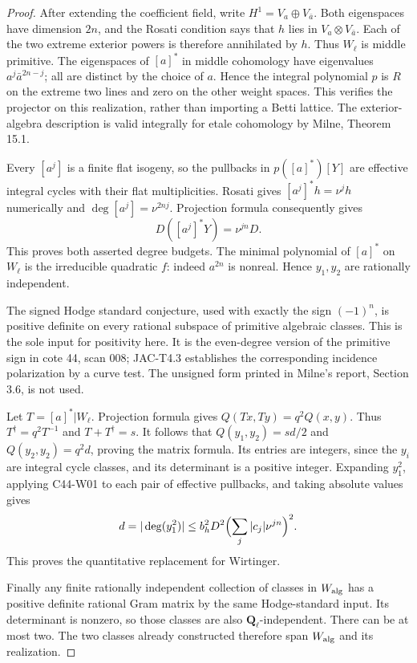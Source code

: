 \documentclass[11pt]{article}
\theoremstyle{remark}\newtheorem{remark}[theorem]{Remark}
\begin{document}
\begin{proof}
After extending the coefficient field, write $H^1=V_a\oplus V_{\bar a}$.
Both eigenspaces have dimension $2n$, and the Rosati condition says
that $h$ lies in $V_a\otimes V_{\bar a}$.  Each of the two extreme
exterior powers is therefore annihilated by $h$.  Thus $W_\ell$ is
middle primitive.  The eigenspaces of $[a]^*$ in middle cohomology
have eigenvalues $a^j\bar a^{2n-j}$; all are distinct by the choice
of $a$.  Hence the integral polynomial $p$ is $R$ on the extreme
two lines and zero on the other weight spaces.  This verifies the
projector on this realization, rather than importing a Betti lattice.
The exterior-algebra description is valid integrally for etale
cohomology by Milne, Theorem 15.1.

Every $[a^j]$ is a finite flat isogeny, so the pullbacks in
$p([a]^*)[Y]$ are effective integral cycles with their flat
multiplicities.  Rosati gives $[a^j]^*h=\nu^jh$ numerically and
$\deg[a^j]=\nu^{2nj}$.  Projection formula consequently gives
\[
 D([a^j]^*Y)=\nu^{jn}D.
\]
This proves both asserted degree budgets.  The minimal polynomial
of $[a]^*$ on $W_\ell$ is the irreducible quadratic $f$: indeed
$a^{2n}$ is nonreal.  Hence $y_1,y_2$ are rationally independent.

The signed Hodge standard conjecture, used with exactly the sign
$(-1)^n$, is positive definite on every rational subspace of
primitive algebraic classes.  This is the sole input for positivity
here.  It is the even-degree version of the primitive sign in
cote 44, scan 008; JAC-T4.3 establishes the corresponding incidence
polarization by a curve test.  The unsigned form printed in
Milne's report, Section 3.6, is not used.

Let $T=[a]^*|W_\ell$.  Projection formula gives
$Q(Tx,Ty)=q^2Q(x,y)$.  Thus $T^\dagger=q^2T^{-1}$ and
$T+T^\dagger=s$.  It follows that
$Q(y_1,y_2)=sd/2$ and $Q(y_2,y_2)=q^2d$, proving the matrix
formula.  Its entries are integers, since the $y_i$ are integral
cycle classes, and its determinant is a positive integer.
Expanding $y_1^2$, applying C44-W01 to each pair of effective
pullbacks, and taking absolute values gives
\[
 d=|\deg(y_1^2)|
 \leq b_h^2D^2\Bigl(\sum_j|c_j|\nu^{jn}\Bigr)^2.
\]
This proves the quantitative replacement for Wirtinger.

Finally any finite rationally independent collection of classes in
$W_{\rm alg}$ has a positive definite rational Gram matrix by the
same Hodge-standard input.  Its determinant is nonzero, so those
classes are also $\mathbf Q_\ell$-independent.  There can be at most
two.  The two classes already constructed therefore span
$W_{\rm alg}$ and its realization.
\end{proof}
\end{document}
